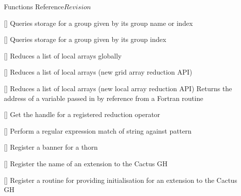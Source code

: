 \begin{cactuspart}{ Functions Reference}{}{$Revision$}
\begin{Lentry}
\item[\code{CCTK\_QueryGroupStorageB}] [\pageref{CCTK-QueryGroupStorageB}]
  Queries storage for a group given by its group name or index

\item[\code{CCTK\_QueryGroupStorageI}] [\pageref{CCTK-QueryGroupStorageI}]
  Queries storage for a group given by its group index

\item[\code{CCTK\_ReduceArraysGlobally}] [\pageref{CCTK-ReduceArraysGlobally}]
  Reduces a list of local arrays globally

\item[\code{CCTK\_ReduceGridArrays}] [\pageref{CCTK-ReduceGridArrays}]
  Reduces a list of local arrays (new grid array reduction API)

\item[\code{CCTK\_ReduceLocalArrays}] [\pageref{CCTK-ReduceLocalArrays}]
  Reduces a list of local arrays (new local array reduction API)
  Returns the address of a variable passed in by reference
  from a Fortran routine



\item[\code{CCTK\_ReductionHandle}] [\pageref{CCTK-ReductionHandle}]
  Get the handle for a registered reduction operator

\item[\code{CCTK\_RegexMatch}] [\pageref{CCTK-RegexMatch}]
  Perform a regular expression match of string against pattern

\item[\code{CCTK\_RegisterBanner}] [\pageref{CCTK-RegisterBanner}]
  Register a banner for a thorn

\item[\code{CCTK\_RegisterGHExtension}]
  [\pageref{CCTK-RegisterGHExtension}]
  Register the name of an extension to the Cactus GH

\item[\code{CCTK\_RegisterGHExtensionInitGH}]
  [\pageref{CCTK-RegisterGHExtensionInitGH}]
  Register a routine for providing initialisation for an extension to
  the Cactus GH


\end{Lentry}
\end{cactuspart}
